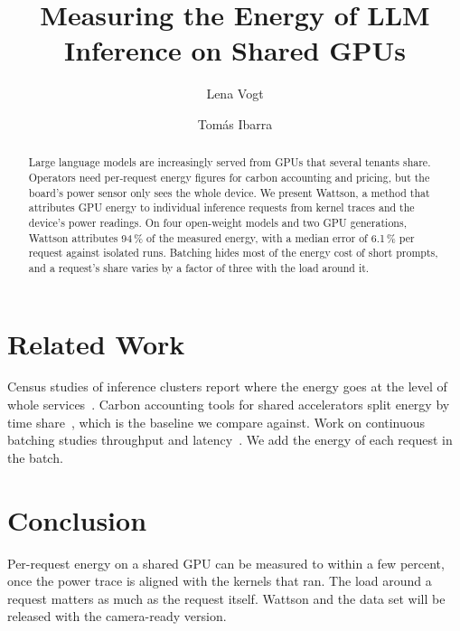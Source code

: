 \documentclass[sigconf,review,anonymous]{acmart}
\newcommand{\sysname}{Wattson}
\begin{document}
\title{Measuring the Energy of LLM Inference on Shared GPUs}

\author{Lena Vogt}

\author{Tom\'as Ibarra}

\begin{abstract}
Large language models are increasingly served from GPUs that several tenants share.
Operators need per-request energy figures for carbon accounting and pricing, but the board's power sensor only sees the whole device.
We present \sysname{}, a method that attributes GPU energy to individual inference requests from kernel traces and the device's power readings.
On four open-weight models and two GPU generations, \sysname{} attributes 94\,\% of the measured energy, with a median error of 6.1\,\% per request against isolated runs.
Batching hides most of the energy cost of short prompts, and a request's share varies by a factor of three with the load around it.
\end{abstract}


\maketitle





\section{Related Work}\label{sec:related}

Census studies of inference clusters report where the energy goes at the level of whole services~\cite{kessler2025inference}.
Carbon accounting tools for shared accelerators split energy by time share~\cite{quintero2023carbon}, which is the baseline we compare against.
Work on continuous batching studies throughput and latency~\cite{teller2024batching}.
We add the energy of each request in the batch.

\section{Conclusion}\label{sec:conclusion}

Per-request energy on a shared GPU can be measured to within a few percent, once the power trace is aligned with the kernels that ran.
The load around a request matters as much as the request itself.
\sysname{} and the data set will be released with the camera-ready version.



\end{document}
